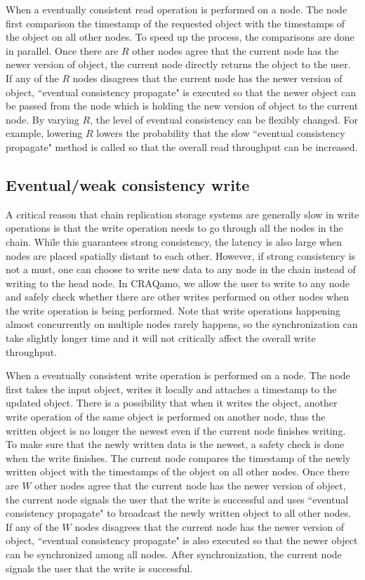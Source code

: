 When a eventually consistent read operation is performed on a node. The node first comparison the timestamp of the requested object with the timestamps of the object on all other nodes. To speed up the process, the comparisons are done in parallel. Once there are $R$ other nodes agree that the current node has the newer version of object, the current node directly returns the object to the user. If any of the $R$ nodes disagrees that the current node has the newer version of object, ``eventual consistency propagate" is executed so that the newer object can be passed from the node which is holding the new version of object to the current node. By varying $R$, the level of eventual consistency can be flexibly changed. For example, lowering $R$ lowers the probability that the slow ``eventual consistency propagate" method is called so that the overall read throughput can be increased.

\subsection{Eventual/weak consistency write}
A critical reason that chain replication storage systems are generally slow in write operations is that the write operation needs to go through all the nodes in the chain. While this guarantees strong consistency, the latency is also large when nodes are placed spatially distant to each other. However, if strong consistency is not a must, one can choose to write new data to any node in the chain instead of writing to the head node. In CRAQamo, we allow the user to write to any node and safely check whether there are other writes performed on other nodes when the write operation is being performed. Note that write operations happening almost concurrently on multiple nodes rarely happens, so the synchronization can take slightly longer time and it will not critically affect the overall write throughput.

When a eventually consistent write operation is performed on a node. The node first takes the input object, writes it locally and attaches a timestamp to the updated object. There is a possibility that when it writes the object, another write operation of the same object is performed on another node, thus the written object is no longer the newest even if the current node finishes writing. To make sure that the newly written data is the newest, a safety check is done when the write finishes. The current node compares the timestamp of the newly written object with the timestamps of the object on all other nodes. Once there are $W$ other nodes agree that the current node has the newer version of object, the current node signals the user that the write is successful and uses ``eventual consistency propagate" to broadcast the newly written object to all other nodes. If any of the $W$ nodes disagrees that the current node has the newer version of object, ``eventual consistency propagate" is also executed so that the newer object can be synchronized among all nodes. After synchronization, the current node signals the user that the write is successful. 

